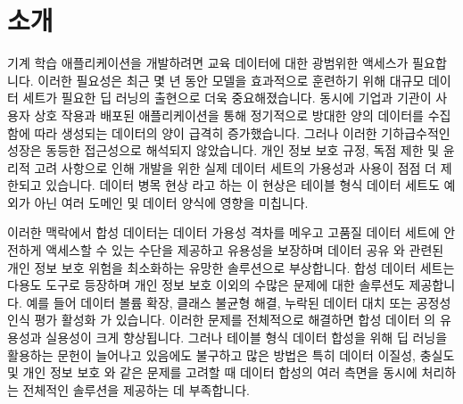 
\section{소개}
\label{sec:intro}


기계 학습 애플리케이션을 개발하려면 교육 데이터에 대한 광범위한 액세스가 필요합니다. 이러한 필요성은 최근 몇 년 동안 모델을 효과적으로 훈련하기 위해 대규모 데이터 세트가 필요한 딥 러닝의 출현으로 더욱 중요해졌습니다. 동시에 기업과 기관이 사용자 상호 작용과 배포된 애플리케이션을 통해 정기적으로 방대한 양의 데이터를 수집함에 따라 생성되는 데이터의 양이 급격히 증가했습니다. 그러나 이러한 기하급수적인 성장은 동등한 접근성으로 해석되지 않았습니다. 개인 정보 보호 규정, 독점 제한 및 윤리적 고려 사항으로 인해 개발을 위한 실제 데이터 세트의 가용성과 사용이 점점 더 제한되고 있습니다. 데이터 병목 현상 \cite{Shani_2023}라고 하는 이 현상은 테이블 형식 데이터 세트도 예외가 아닌 여러 도메인 및 데이터 양식에 영향을 미칩니다.


이러한 맥락에서 합성 데이터는 데이터 가용성 격차를 메우고 고품질 데이터 세트에 안전하게 액세스할 수 있는 수단을 제공하고 유용성을 보장하며 데이터 공유 \cite{drechsler2011synthetic, jordon2022synthetic, united2023synthetic, hu2023sokprivacypreservingdatasynthesis}와 관련된 개인 정보 보호 위험을 최소화하는 유망한 솔루션으로 부상합니다.
합성 데이터 세트는 다용도 도구로 등장하며 개인 정보 보호 이외의 수많은 문제에 대한 솔루션도 제공합니다.
예를 들어 데이터 볼륨 확장, 클래스 불균형 해결, 누락된 데이터 대치 또는 공정성 인식 평가 활성화 \cite{NEURIPS2021_ba9fab00}가 있습니다.
이러한 문제를 전체적으로 해결하면 합성 데이터 \cite{vanbreugel2023privacynavigatingopportunitieschallenges}의 유용성과 실용성이 크게 향상됩니다.
그러나 테이블 형식 데이터 합성을 위해 딥 러닝을 활용하는 문헌이 늘어나고 있음에도 불구하고 많은 방법은 특히 데이터 이질성, 충실도 및 개인 정보 보호 \cite{bauer2024,shi2025comprehensivesurveysynthetictabular}와 같은 문제를 고려할 때 데이터 합성의 여러 측면을 동시에 처리하는 전체적인 솔루션을 제공하는 데 부족합니다.


